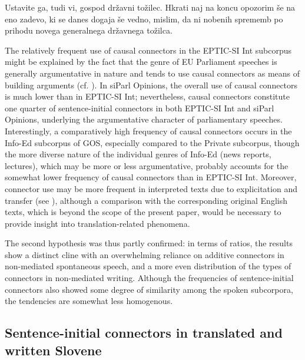 \documentclass[output=paper]{langscibook}
\begin{document}
\ea\label{ex:mikolic:10}
Ustavite ga, tudi vi, gospod državni tožilec. Hkrati naj na koncu opozorim še na eno zadevo, ki se danes dogaja še vedno, mislim, da ni nobenih sprememb po prihodu novega generalnega državnega tožilca. \\
\z

The relatively frequent use of causal connectors in the EPTIC-SI Int subcorpus might be explained by the fact that the genre of EU Parliament speeches is generally argumentative in nature and tends to use causal connectors as means of building arguments (cf. \citealt{DidriksenGjesdal2013}). In siParl Opinions, the overall use of causal connectors is much lower than in EPTIC-SI Int; nevertheless, causal connectors constitute one quarter of sentence-initial connectors in both EPTIC-SI Int and siParl Opinions, underlying the argumentative character of parliamentary speeches. Interestingly, a comparatively high frequency of causal connectors occurs in the Info-Ed subcorpus of GOS, especially compared to the Private subcorpus, though the more diverse nature of the individual genres of Info-Ed (news reports, lectures), which may be more or less argumentative, probably accounts for the somewhat lower frequency of causal connectors than in EPTIC-SI Int. Moreover, connector use may be more frequent in interpreted texts due to explicitation and transfer (see ), although a comparison with the corresponding original English texts, which is beyond the scope of the present paper, would be necessary to provide insight into translation-related phenomena.

The second hypothesis was thus partly confirmed: in terms of ratios, the results show a distinct cline with an overwhelming reliance on additive connectors in non-mediated spontaneous speech, and a more even distribution of the types of connectors in non-mediated writing. Although the frequencies of sentence-initial connectors also showed some degree of similarity among the spoken subcorpora, the tendencies are somewhat less homogenous. 

\subsection{
Sentence-initial connectors in translated and written Slovene
}\label{sec:mikolic:5.3}
\end{document}
